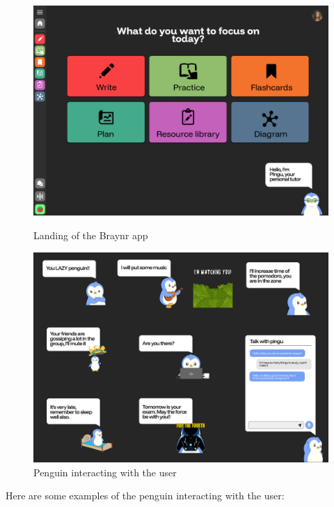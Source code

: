 \documentclass{report}
\begin{document}
\begin{figure}[H]
    \centering
    \begin{minipage}{0.48\textwidth}
        \centering
        \includegraphics[width=\textwidth]{images/Home.png}
        \caption{Landing of the Braynr app}
        \label{fig:ui}
    \end{minipage}\hfill %
    \begin{minipage}{0.48\textwidth}
        \centering
        \includegraphics[width=\textwidth]{images/Pingu showcase.png}
        \caption{Penguin interacting with the user}
        \label{fig:chat}
    \end{minipage}
\end{figure}

Here are some examples of the penguin interacting with the user:
\end{document}

